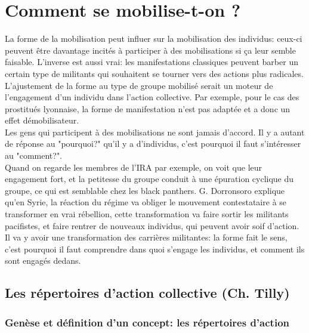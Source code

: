 \documentclass[10pt, a4paper, openany]{book}
\begin{document}
\part{Comment se mobilise-t-on ?}

La forme de la mobilisation peut influer sur la mobilisation des individus: ceux-ci peuvent être davantage incités à participer à des mobilisations si ça leur semble faisable. L'inverse est aussi vrai: les manifestations classiques peuvent barber un certain type de militants qui souhaitent se tourner vers des actions plus radicales. \\
L'ajustement de la forme au type de groupe mobilisé serait un moteur de l'engagement d'un individu dans l'action collective. Par exemple, pour le cas des prostitués lyonnaise, la forme de manifestation n'est pas adaptée et a donc un effet démobilisateur. \\
Les gens qui participent à des mobilisations ne sont jamais d'accord. Il y a autant de réponse au "pourquoi?" qu'il y a d'individus, c'est pourquoi il faut s'intéresser au "comment?". \\
Quand on regarde les membres de l'IRA par exemple, on voit que leur engagement fort, et la petitesse du groupe conduit à une épuration cyclique du groupe, ce qui est semblable chez les black panthers. G. Dorronsoro explique qu'en Syrie, la réaction du régime va obliger le mouvement contestataire à se transformer en vrai rébellion, cette transformation va faire sortir les militants pacifistes, et faire rentrer de nouveaux individus, qui peuvent avoir soif d'action. Il va y avoir une transformation des carrières militantes: la forme fait le sens, c'est pourquoi il faut comprendre dans quoi s'engage les individus, et comment ils sont engagés dedans. 

\chapter{Les répertoires d'action collective (Ch. Tilly)}

\section{Genèse et définition d'un concept: les répertoires d'action}
\end{document}
